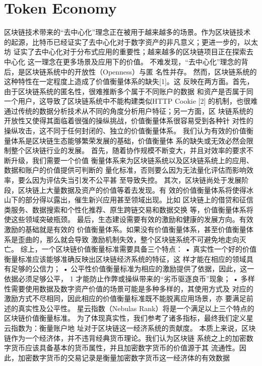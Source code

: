 \section{Token Economy}

区块链技术带来的“去中心化”理念正在被用于越来越多的场景。作为区块链技术
的起源，比特币已经证实了去中心化对于数字资产的非凡意义；更进一步的，以太坊
证实了去中心化对于分布式应用的重要性；越来越多的区块链项目正在探索去中心化
这一理念在更多场景及应用下的价值。
不难发现，“去中心化”理念的背后，是区块链系统中的开放性（Openness）与匿
名性并存。
然而，区块链系统的这种特性在一定程度上造成了价值衡量体系的缺失[1]。这
反映在两方面。首先，由于区块链系统的匿名性，很难推断多个属于不同账户的数据
和资产是否属于同一个用户，这导致了区块链系统中不能构建类似HTTP Cookie [2]
的机制，也很难通过传统的数据分析技术从不同的角度分析用户特征；另一方面，区
块链系统的开放性又使得其面临着很强的操纵挑战，价值衡量体系很容易受到各种针
对性的操纵攻击，这不同于任何封闭的、独立的价值衡量体系。
我们认为有效的价值衡量体系是区块链生态能够繁荣发展的基础，价值衡量体
系的缺失或无效必然会限制整个区块链行业的发展。
首先，随着协作规模不断变大，并且对效率的要求不断升级，我们需要一个价值
衡量体系来为区块链系统以及区块链系统上的应用、数据和账户的价值提供可判断的
量化标准，否则要么因为无法量化评估而影响效率，要么因为评估失当引发不公平甚
至导致失控。
其次，区块链尚处于发展阶段，区块链上大量数据及资产的价值等着去发现。有
效的价值衡量体系将使得冰山下的部分得以露出，催生新兴应用甚至领域出现。比如
区块链上的借贷和征信类服务、数据搜索和个性化推荐、原生跨链交易和数据交换
等，价值衡量体系将使这些领域突破瓶颈。
最后，生态建设需要有效的激励和健康的发展方向。有效激励的基础就是有效的
价值衡量体系。如果没有价值衡量体系，甚至价值衡量体系是歪曲的，那么就会导致
激励机制失效，整个区块链系统不可避免地走向灭亡。
综上，一个区块链价值衡量标准需要具备三个特点：
• 真实性一个好的价值衡量标准应该能够准确反映出区块链经济系统的特征，这
样才能在相应的领域具有足够的公信力；
• 公平性价值衡量标准为相应的激励提供了依据，因此，这一依据必须足够公平，
1
才能防止作弊或操纵带来的“劣币驱逐良币”现象；
• 多样性需要使用数据及数字资产价值的场景可能是多种多样的，其使用方式及
对应的激励方式不尽相同，因此相应的价值衡量标准既不能脱离应用场景，亦
要满足前述的真实性及公平性。
星云指数（Nebulas Rank）将是一个满足以上三个特点的区块链价值衡量标准。
为了体现真实性，我们参考了诸多指标，最终我们定义星云指数为：衡量账户地
址对于区块链这一经济系统的贡献度。
本质上来说，区块链作为一个经济体，并不违背经典货币理论。我们认为区块链
系统之上的加密数字货币应该具备基本的货币属性，并且加密数字货币的价值源于其
流通性。因此，加密数字货币的交易记录是衡量加密数字货币这一经济体的有效数据
